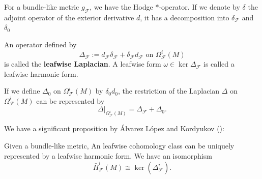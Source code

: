     For a bundle-like metric $g_{\mathcal{F}}$, we have the Hodge $*$-operator.
    If we denote by $\delta$ the adjoint operator of the exterior derivative $d$, it has a decomposition into $\delta_{\mathcal{F}}$ and $\delta_{0}$
    \begin{center}
    \end{center}
    
    \begin{definition}
    An operator defined by
    \begin{equation*}
        \Delta_{\mathcal{F}} := d_{\mathcal{F}}\delta_{\mathcal{F}} + \delta_{\mathcal{F}}d_{\mathcal{F}} \text{ on  } \Omega_{\mathcal{F}}^{i}(M)
    \end{equation*}
    is called the \textbf{leafwise Laplacian}.
    A leafwise form $\omega\in\ker\Delta_{\mathcal{F}}$ is called a leafwise harmonic form.
    \end{definition}
    
    If we define $\Delta_{0}$ on $\Omega_{\mathcal{F}}^{i}(M)$ by $\delta_{0}d_{0}$, the restriction of the Laplacian $\Delta$ on $\Omega_{\mathcal{F}}^{i}(M)$ can be represented by
    \begin{equation*}
        \Delta|_{\Omega_{\mathcal{F}}^{i}(M)} = \Delta_{\mathcal{F}} + \Delta_{0}.
    \end{equation*}
    

    We have a significant proposition by \'Alvarez L\'opez and Kordyukov (\cite{lopez2001long}):
    \begin{proposition}
    Given a bundle-like metric, An leafwise cohomology class can be uniquely represented by a leafwise harmonic form.
    We have an isomorphism
    \begin{equation*}
        \bar{H}_{\mathcal{F}}^{i}(M) \cong \ker(\Delta_{\mathcal{F}}^{i}).
    \end{equation*}
    \end{proposition}